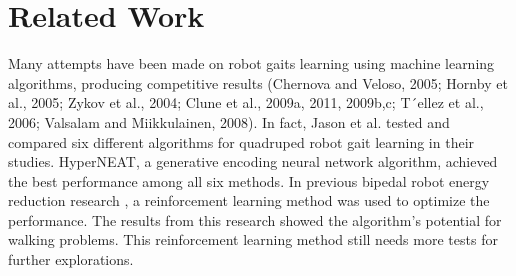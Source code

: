 \section{Related Work}

Many attempts have been made on robot gaits learning using machine
learning algorithms, producing competitive results  (Chernova and Veloso, 2005; Hornby et al., 2005;
Zykov et al., 2004; Clune et al., 2009a, 2011, 2009b,c; T´ellez et
al., 2006; Valsalam and Miikkulainen, 2008). In fact, Jason et
al. tested and compared six different algorithms for quadruped robot
gait learning in their studies. HyperNEAT, a generative encoding
neural network algorithm, achieved the best performance among all six
methods. In previous bipedal robot energy reduction
research \citep{kormushev2011bipedal-walking-energy}, a reinforcement learning method was used to optimize the
performance. The results from this research showed the
algorithm's potential for walking problems. This reinforcement
learning method still needs more tests for further explorations.

